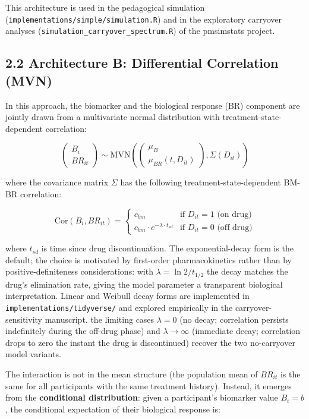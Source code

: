\documentclass[
]{article}
\begin{document}
This architecture is used in the pedagogical simulation
(\texttt{implementations/simple/simulation.R}) and in the exploratory carryover
analyses (\texttt{simulation\_carryover\_spectrum.R}) of the
pmsimstats project.

\subsection{2.2 Architecture B: Differential Correlation (MVN)}

In this approach, the biomarker and the biological response (BR)
component are jointly drawn from a multivariate normal distribution
with treatment-state-dependent correlation:

\[\begin{pmatrix} B_i \\ BR_{it} \end{pmatrix} \sim
\text{MVN}\left(\begin{pmatrix} \mu_B \\ \mu_{BR}(t, D_{it})
\end{pmatrix}, \Sigma(D_{it})\right)\]

where the covariance matrix \(\Sigma\) has the following
treatment-state-dependent BM-BR correlation:

\[\text{Cor}(B_i, BR_{it}) = \begin{cases}
c_{bm} & \text{if } D_{it} = 1 \text{ (on drug)} \\
c_{bm} \cdot e^{-\lambda \cdot t_{sd}} &
\text{if } D_{it} = 0 \text{ (off drug)}
\end{cases}\]

where \(t_{sd}\) is time since drug discontinuation. The
exponential-decay form is the default; \textcolor{addblue}{the choice is motivated by first-order pharmacokinetics rather than by positive-definiteness considerations: with $\lambda = \ln 2 / t_{1/2}$ the decay matches the drug's elimination rate, giving the model parameter a transparent biological interpretation. Linear and Weibull decay forms are implemented in \texttt{implementations/tidyverse/} and explored empirically in the carryover-sensitivity manuscript.} the limiting cases
\(\lambda = 0\) (no decay; correlation persists indefinitely
during the off-drug phase) and \(\lambda \to \infty\) (immediate
decay; correlation drops to zero the instant the drug is
discontinued) recover the two no-carryover model variants.

The interaction is not in the mean structure (the population mean
of \(BR_{it}\) is the same for all participants with the same
treatment history). Instead, it emerges from the \textbf{conditional
distribution}: given a participant's biomarker value \(B_i = b\),
the conditional expectation of their biological response is:
\end{document}
